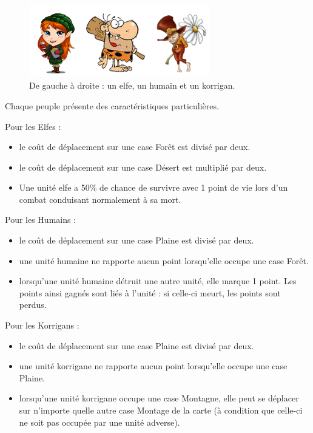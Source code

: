 	\begin{figure}[h!]
			\begin{center}
				\includegraphics[width=0.7\textwidth]{figure/peuple.png}
			\end{center}
			\caption{De gauche à droite : un elfe, un humain et un korrigan.}
			\label{fig:launch}
	\end{figure}
	
	
	\newpage
	Chaque peuple présente des caractéristiques particulières.
	
		Pour les Elfes :
		\begin{itemize}
			\item le coût de déplacement sur une case Forêt est divisé par deux. 
			\item le coût de déplacement sur une case Désert est multiplié par deux.
			\item Une unité elfe a 50\% de chance de survivre avec 1 point de vie lors d’un combat conduisant normalement à sa mort.
		\end{itemize}
		
		Pour les Humains :
		\begin{itemize}
			\item le coût de déplacement sur une case Plaine est divisé par deux.
			\item une unité humaine ne rapporte aucun point lorsqu'elle occupe une case Forêt.
			\item lorsqu’une unité humaine détruit une autre unité, elle marque 1 point. Les points ainsi gagnés sont liés à l'unité : si celle-ci meurt, les points sont perdus.
		\end{itemize}
		
		Pour les Korrigans :
		\begin{itemize}
			\item le coût de déplacement sur une case Plaine est divisé par deux.
			\item une unité korrigane ne rapporte aucun point lorsqu'elle occupe une case Plaine.
			\item lorsqu'une unité korrigane occupe une case Montagne, elle peut se déplacer sur n’importe quelle autre case Montage de la carte (à condition que celle-ci ne soit pas occupée par une unité adverse).
		\end{itemize}

